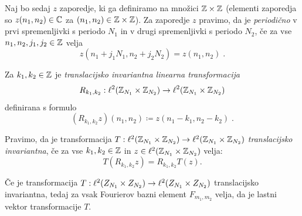Naj bo sedaj $z$ zaporedje, ki ga definiramo na množici $\mathbb Z \times \mathbb Z$ (elementi zaporedja so $z(n_1,n_2) \in \mathbb C$ za $(n_1,n_2) \in \mathbb Z \times \mathbb Z$). Za zaporedje $z$ pravimo, da je \emph{periodično} v prvi spremenljivki s periodo $N_1$ in v drugi spremenljivki s periodo $N_2$, če za vse $n_1, n_2, j_1, j_2 \in \mathbb Z$ velja
$$z(n_1 + j_1 N_1, n_2 + j_2 N_2) = z(n_1, n_2) \;.$$
%
\begin{definicija}
Za $k_1, k_2 \in \mathbb Z$ je \emph{translacijsko invariantna linearna transformacija}
$$R_{k_1, k_2} : \ell^2(\mathbb Z_{N_1} \times \mathbb Z_{N_2}) \to \ell^2(\mathbb Z_{N_1} \times \mathbb Z_{N_2})$$
definirana s formulo
$$(R_{k_1, k_2}z)(n_1, n_2) \coloneqq z(n_1 - k_1, n_2 - k_2) \;.$$
\end{definicija}
%
Pravimo, da je transformacija $T : \ell^2(\mathbb Z_{N_1} \times \mathbb Z_{N_2}) \to \ell^2(\mathbb Z_{N_1} \times \mathbb Z_{N_2})$ \emph{translacijsko invariantna}, če za vse $k_1, k_2 \in \mathbb Z$ in $z \in \ell^2(\mathbb Z_{N_1} \times \mathbb Z_{N_2})$ velja:
$$T(R_{k_1, k_2} z) = R_{k_1, k_2} T(z).$$
%
\begin{trditev}
Če je transformacija $T : \ell^2(Z_{N_1} \times Z_{N_2}) \to \ell^2(Z_{N_1} \times Z_{N_2})$ translacijsko invariantna, tedaj za vsak Fourierov bazni element $F_{m_1, m_2}$ velja, da je lastni vektor transformacije $T$.
\end{trditev}
%
